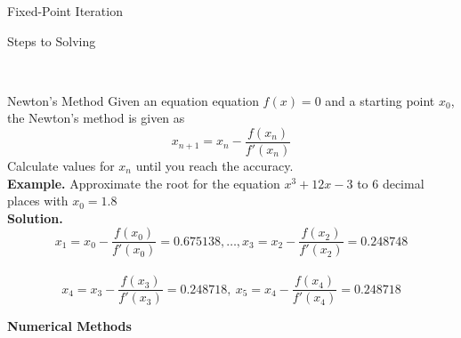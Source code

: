\documentclass{article}
\begin{document}
\begin{multicols*}{3}
\begin{blackbox}{Fixed-Point Iteration}
{\begin{bluebox}{Steps to Solving}
    \end{bluebox}\\[-2ex]
    }
\end{blackbox}
\begin{blackbox}{Newton's Method}
    {\scriptsize
    Given an equation equation $f(x) = 0$ and a starting point $x_0$, the Newton's method is given as\\[-2ex]
    \[x_{n+1} = x_n - \frac{f(x_n)}{f'(x_n)}\]
    Calculate values for $x_n$ until you reach the accuracy.\\
    \textbf{Example.} Approximate the root for the equation $x^3 + 12x - 3$ to 6 decimal places with $x_0 = 1.8$  \\
    \textbf{Solution.}\\[-5ex]
    \[x_1 = x_0 - \frac{f(x_0)}{f'(x_0)} = 0.675138, \ldots, x_3 = x_2 - \frac{f(x_2)}{f'(x_2)} = 0.248748\]\\[-4ex]        \[x_4 = x_3 - \frac{f(x_3)}{f'(x_3)} = 0.248718, \ x_5 = x_4 - \frac{f(x_4)}{f'(x_4)} = 0.248718\]
    }
\end{blackbox}
\begin{blackbox}
    
\end{blackbox}

\end{multicols*}
\begin{center}{\large{\textbf{Numerical Methods}}}\\
\end{center}
\end{document}
